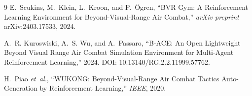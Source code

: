 \documentclass[11pt]{article}
\begin{document}

\begin{thebibliography}{9}
E.~Scukins, M.~Klein, L.~Kroon, and P.~\"Ogren, ``BVR Gym: A Reinforcement Learning Environment for Beyond-Visual-Range Air Combat,'' \emph{arXiv preprint} arXiv:2403.17533, 2024.

A.~R. Kuroswiski, A.~S. Wu, and A.~Passaro, ``B-ACE: An Open Lightweight Beyond Visual Range Air Combat Simulation Environment for Multi-Agent Reinforcement Learning,'' 2024. DOI: 10.13140/RG.2.2.11999.57762.

H.~Piao \emph{et~al.}, ``WUKONG: Beyond-Visual-Range Air Combat Tactics Auto-Generation by Reinforcement Learning,'' \emph{IEEE}, 2020.
\end{thebibliography}

\end{document}
